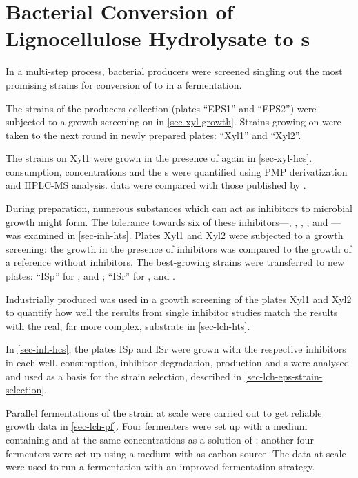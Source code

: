 \chapter[From Lignocellulose Hydrolysate to \EPS{}s]{Bacterial Conversion of Lignocellulose Hydrolysate to \EPS{}s\label{chap-lch-eps}}
\label{intext-lch-eps-overview}In a multi-step process, bacterial \eps{} producers were screened singling out the most promising strains for conversion of \lch{} to \eps{} in a fermentation.

The strains of the \eps{} producers collection (plates \enquote{EPS1} and \enquote{EPS2}) were subjected to a growth screening on \xyl{} in \vref{sec-xyl-growth}. Strains growing on \xyl{} were taken to the next round in newly prepared plates: \enquote{Xyl1} and \enquote{Xyl2}.

The strains on Xyl1 were grown in the presence of \xyl{} again in \vref{sec-xyl-hcs}. \XYL{} consumption, \eps{} concentrations and the \eps{} \amc{}s were quantified using PMP derivatization and HPLC-MS analysis. \EPS{} \amc{} data were compared with those published by \textcite{Ruehmann2015b}.

During \lch{} preparation, numerous substances which can act as inhibitors to microbial growth might form. The tolerance towards six of these inhibitors---\fur{}, \hmf{}, \van{}, \acet{}, \fora{} and \laev{}---was examined in \vref{sec-inh-hts}. Plates Xyl1 and Xyl2 were subjected to a growth screening: the growth in the presence of inhibitors was compared to the growth of a reference without inhibitors. The best-growing strains were transferred to new plates: \enquote{ISp} for \fur{}, \hmf{} and \van{}; \enquote{ISr} for \acet{}, \fora{} and \laev{}.

Industrially produced \lch{} was used in a growth screening of the plates Xyl1 and Xyl2 to quantify how well the results from single inhibitor studies match the results with the real, far more complex, substrate in \vref{sec-lch-hts}.

In \vref{sec-inh-hcs}, the plates ISp and ISr were grown with the respective inhibitors in each well. \GLC{} consumption, inhibitor degradation, \eps{} production and \amc{}s were analysed and used as a basis for the strain selection, described in \vref{sec-lch-eps-strain-selection}.

Parallel fermentations of the strain \strain{} at  scale were carried out to get reliable growth data in \vref{sec-lch-pf}. Four fermenters were set up with a medium containing \glc{} and \xyl{} at the same concentrations as a  solution of \lch{}; another four fermenters were set up using a medium with \lch{} as carbon source. The data at  scale were used to run a  fermentation with an improved fermentation strategy.

